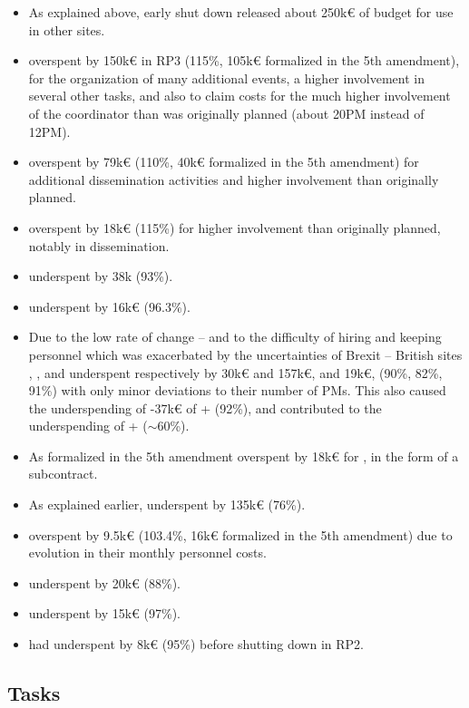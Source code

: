 \begin{itemize}
\item As explained above,  early shut down released about
  250k€ of budget for use in other sites.
\item {} overspent by 150k€ in RP3 (115\%, 105k€ formalized in
  the 5th amendment), for the organization of many additional events,
  a higher involvement in several other tasks, and also to claim costs
  for the much higher involvement of the coordinator than was
  originally planned (about 20PM instead of 12PM).
\item {} overspent by 79k€ (110\%, 40k€ formalized in the 5th
  amendment) for additional dissemination activities and higher
  involvement than originally planned.
\item {} overspent by 18k€ (115\%) for higher involvement than
  originally planned, notably in dissemination.
\item {} underspent by 38k (93\%).
\item {} underspent by 16k€ (96.3\%).
\item Due to the low rate of change -- and to the difficulty of
  hiring and keeping personnel which was exacerbated by the uncertainties
  of Brexit -- British sites ,
  , and  underspent respectively by 30k€ and 157k€,
  and 19k€, (90\%, 82\%, 91\%) with only minor deviations to their
  number of PMs. This also caused the underspending of -37k€ of
  + (92\%), and contributed to the underspending
  of + ($\sim$60\%).
\item As formalized in the 5th amendment  overspent by 18k€
  for , in the form of a subcontract.
\item As explained earlier,  underspent by 135k€ (76\%).
\item {} overspent by 9.5k€ (103.4\%, 16k€ formalized in the 5th
  amendment) due to evolution in their monthly personnel costs.
\item {} underspent by 20k€ (88\%).
\item {} underspent by 15k€ (97\%).
\item {} had underspent by 8k€ (95\%) before shutting down in
  RP2.
\end{itemize}

\subsection{Tasks}

